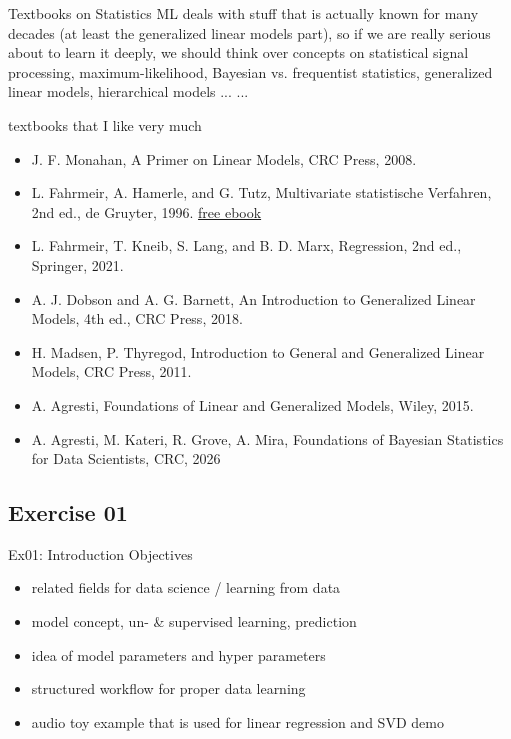 \documentclass[mathserif, aspectratio=1610]{intbeamer}
\begin{document}
\begin{frame}{Textbooks on Statistics}
    ML deals with stuff that is actually known for many decades (at least the generalized linear models part), so if we are really
    serious about to learn it deeply, we should think over concepts on
    statistical signal processing, maximum-likelihood, Bayesian vs. frequentist
    statistics, generalized linear models, hierarchical models ... ...

    textbooks that I like very much
  \begin{itemize}
  \item J. F. Monahan, A Primer on Linear Models, CRC Press, 2008.
  \item L. Fahrmeir, A. Hamerle, and G. Tutz, Multivariate statistische Verfahren, 2nd ed., de Gruyter, 1996.
  \href{https://www.degruyter.com/document/doi/10.1515/9783110816020/html}{free ebook}
  \item L. Fahrmeir, T. Kneib, S. Lang, and B. D. Marx, Regression, 2nd ed., Springer, 2021.
  \item A. J. Dobson and A. G. Barnett, An Introduction to Generalized Linear Models, 4th ed., CRC Press, 2018.
  \item H. Madsen, P. Thyregod, Introduction to General and Generalized Linear Models, CRC Press, 2011.
  \item A. Agresti, Foundations of Linear and Generalized Models, Wiley, 2015.
  \item A. Agresti, M. Kateri, R. Grove, A. Mira, Foundations of Bayesian Statistics for Data Scientists, CRC, 2026
  \end{itemize}
\end{frame}





\subsection{Exercise 01}
\begin{frame}{Ex01: Introduction}
Objectives
\begin{itemize}
\item related fields for data science / learning from data
\item model concept, un- \& supervised learning, prediction
\item idea of model parameters and hyper parameters
\item structured workflow for proper data learning
\item audio toy example that is used for linear regression and SVD demo
\end{itemize}
\end{frame}
\end{document}
